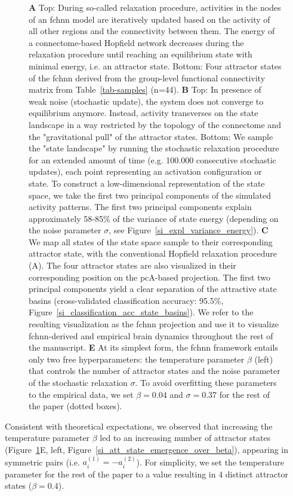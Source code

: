 \documentclass{article}
\begin{document}
\begin{figure}[!htbp]
{\textbf{A} Top: During so-called relaxation procedure, activities in the nodes of an \acrshort{fchnn} model are iteratively updated based on the activity of all other regions and the connectivity between them. The energy of a
connectome-based Hopfield network decreases during the relaxation procedure until reaching an equilibrium state with
minimal energy, i.e. an attractor state. Bottom: Four attractor states of the \acrshort{fchnn} derived from the
group-level functional connectivity matrix from Table~\ref{tab-samples} (n=44).
\textbf{B} Top: In presence of weak noise (stochastic update), the system
does not converge to equilibrium anymore. Instead, activity transverses on the state landscape in a way
restricted by the topology of the connectome and the "gravitational pull" of the attractor states. Bottom: We sample
the "state landscape" by running the stochastic relaxation procedure for an extended amount of time (e.g. 100.000 consecutive
stochastic updates), each point representing an activation configuration or state. To construct a
low-dimensional representation of the state space, we take the first two principal components of the simulated activity
patterns. The first two principal components explain approximately 58-85\% of the variance of state energy (depending
on the noise parameter $\sigma$, see Figure~\ref{si_expl_variance_energy}).
\textbf{C} We map all states of the state space sample to their corresponding attractor state, with the conventional
Hopfield relaxation procedure (A). The four attractor states are also visualized in their corresponding position on the
\acrshort{pc}A-based projection. The first two principal components yield a clear separation of the attractive state basins
(cross-validated classification accuracy: 95.5\%, Figure~\ref{si_classification_acc_state_basins}). We refer to the resulting visualization
as the \acrshort{fchnn} projection and use it to visualize \acrshort{fchnn}-derived and empirical brain dynamics throughout the rest of
the manuscript.
\textbf{E} At its simplest form, the \acrshort{fchnn} framework entails only two free hyperparameters: the temperature parameter
$\beta$ (left) that controls the number of attractor states and the noise parameter of the stochastic relaxation
$\sigma$. To avoid overfitting these parameters to the empirical data, we set $\beta=0.04$ and $\sigma=0.37$ for the
rest of the paper (dotted boxes).}
\label{attractors}
\end{figure}

Consistent with theoretical expectations, we observed that increasing the temperature parameter $\beta$ led to an
increasing number of attractor states (Figure~\ref{attractors}E, left, Figure~\ref{si_att_state_emergence_over_beta}), appearing in symmetric pairs
(i.e. $a_i^{(1)} = -a_i^{(2)}$). For simplicity, we set the temperature parameter for the rest of the paper to a value
resulting in 4 distinct attractor states ($\beta=0.4$).
\end{document}
